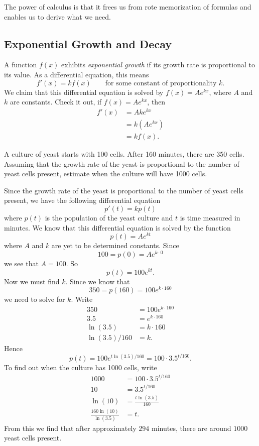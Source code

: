 The power of calculus is that it frees us from rote memorization of
formulas and enables us to derive what we need.



\subsection*{Exponential Growth and Decay}

A function $f(x)$ exhibits \textit{exponential
  growth} if its growth rate is proportional
to its value. As a differential equation, this means
\[
f'(x) = k f(x)\qquad\text{for some constant of proportionality $k$.}
\]
We claim that this differential equation is solved by $f(x) = A
e^{kx}$, where $A$ and $k$ are constants.  Check it out, if $f(x) =
Ae^{kx}$, then
\begin{align*}
f'(x) &= Ak e^{kx}\\
&= k\left(Ae^{kx} \right)\\
&= k f(x).
\end{align*}

\begin{example}
A culture of yeast starts with 100 cells. After 160 minutes, there
are 350 cells. Assuming that the growth rate of the yeast is
proportional to the number of yeast cells present, estimate when the
culture will have 1000 cells.
\end{example}

\begin{solution}
Since the growth rate of the yeast is proportional to the number of
yeast cells present, we have the following differential equation
\[
p'(t) = k p(t)
\]
where $p(t)$ is the population of the yeast culture and $t$ is time
measured in minutes. We know that this differential equation is solved
by the function
\[
p(t) = A e^{kt}
\]
where $A$ and $k$ are yet to be determined constants. Since
\[
100 = p(0) = Ae^{k\cdot 0}
\]
we see that $A = 100$. So 
\[
p(t) = 100 e^{kt}.
\]
Now we must find $k$. Since we know that 
\[
350 = p(160) = 100e^{k\cdot 160}
\]
we need to solve for $k$. Write
\begin{align*}
350 &= 100 e^{k\cdot 160}\\
3.5 &= e^{k\cdot 160}\\
\ln(3.5) &= k\cdot 160\\
\ln(3.5)/160 &= k. 
\end{align*}
Hence
\[
p(t) = 100 e^{t\ln(3.5)/160} = 100 \cdot 3.5^{t/160}.
\]
To find out when the culture has 1000 cells, write
\begin{align*}
1000 &= 100 \cdot 3.5^{t/160}\\
10 &= 3.5^{t/160}\\
\ln(10) &= \frac{t\ln(3.5)}{160}\\
\frac{160\ln(10)}{\ln(3.5)} &= t.
\end{align*}
From this we find that after approximately $294$ minutes, there are
around $1000$ yeast cells present.
\end{solution}


